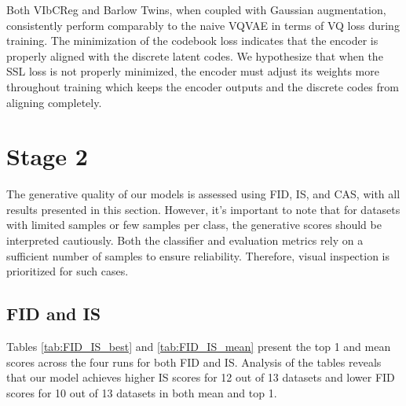 \documentclass[../../thesis.tex]{subfiles}
\begin{document}
Both VIbCReg and Barlow Twins, when coupled with Gaussian augmentation, consistently perform comparably to the naive VQVAE in terms of VQ loss during training. The minimization of the codebook loss indicates that the encoder is properly aligned with the discrete latent codes. We hypothesize that when the SSL loss is not properly minimized, the encoder must adjust its weights more throughout training which keeps the encoder outputs and the discrete codes from aligning completely.

\section{Stage 2}
The generative quality of our models is assessed using FID, IS, and CAS, with all results presented in this section. However, it's important to note that for datasets with limited samples or few samples per class, the generative scores should be interpreted cautiously. Both the classifier and evaluation metrics rely on a sufficient number of samples to ensure reliability. Therefore, visual inspection is prioritized for such cases.


\subsection{FID and IS}

Tables \ref{tab:FID_IS_best} and \ref{tab:FID_IS_mean} present the top 1 and mean scores across the four runs for both FID and IS. Analysis of the tables reveals that our model achieves higher IS scores for 12 out of 13 datasets and lower FID scores for 10 out of 13 datasets in both mean and top 1.\newline
\end{document}
